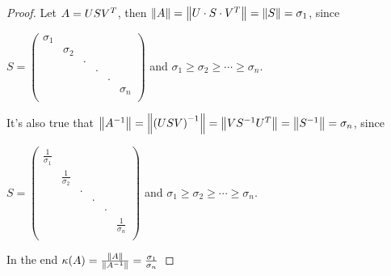 \documentclass[computational_mathematics.tex]{subfiles}
\begin{document}
\begin{proof}
Let $A = US{V}^{T}$, then $\left\lVert A\right\rVert = \left\lVert U \cdot S \cdot {V}^{T}\right\rVert = \left\lVert S\right\rVert = \sigma_1$, since 

$S =  \begin{pmatrix}
    \sigma_1 &&&&&\\
    & \sigma_2&&&&\\
    && \cdot&&&\\
    &&& \cdot&&\\
    &&&& \cdot&\\
    &&&&& \sigma_n\\
  \end{pmatrix}$ and $\sigma_1 \ge \sigma_2 \ge \cdots \ge \sigma_n$. 

  It's also true that $\left\lVert{A}^{-1}\right\rVert = \left\lVert{(USV)}^{-1}\right\rVert = \left\lVert V{S}^{-1} {U}^{T}\right\rVert = \left\lVert{S}^{-1}\right\rVert = \sigma_n$, since 

$S =  \begin{pmatrix}
  \frac{1}{\sigma_1} &&&&&\\
    & \frac{1}{\sigma_2}&&&&\\
    && \cdot&&&\\
    &&& \cdot&&\\
    &&&& \cdot&\\
    &&&&& \frac{1}{\sigma_n}\\
  \end{pmatrix}$ and $\sigma_1 \ge \sigma_2 \ge \cdots \ge \sigma_n$. 

In the end $\kappa(A) = \frac{\left\lVert A\right\rVert}{\left\lVert{A}^{-1}\right\rVert} = \frac{\sigma_1}{\sigma_n}$
\end{proof}
\end{document}
